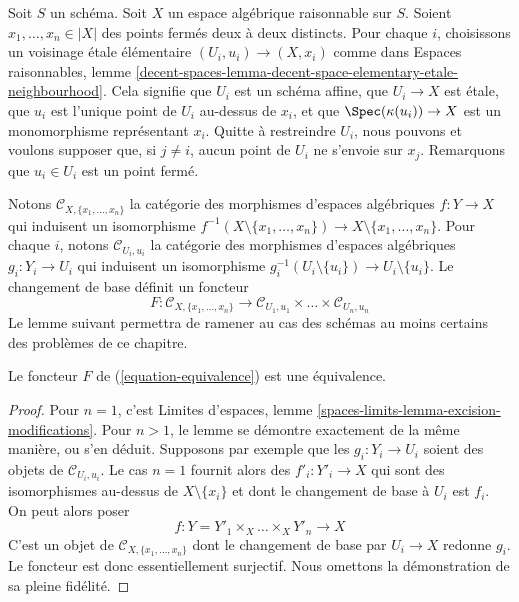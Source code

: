 \noindent
Soit $S$ un schéma. Soit $X$ un espace algébrique raisonnable sur $S$.
Soient $x_1, \ldots, x_n \in |X|$ des points fermés deux à deux distincts.
Pour chaque $i$, choisissons un voisinage étale élémentaire
$(U_i, u_i) \to (X, x_i)$ comme dans Espaces raisonnables, lemme
\ref{decent-spaces-lemma-decent-space-elementary-etale-neighbourhood}.
Cela signifie que $U_i$ est un schéma affine, que $U_i \to X$ est étale,
que $u_i$ est l'unique point de $U_i$ au-dessus de $x_i$, et que
$\Spec(\kappa(u_i)) \to X$ est un monomorphisme représentant $x_i$.
Quitte à restreindre $U_i$, nous pouvons et voulons supposer que, si
$j \not = i$, aucun point de $U_i$ ne s'envoie sur $x_j$.
Remarquons que $u_i \in U_i$ est un point fermé.

\medskip\noindent
Notons $\mathcal{C}_{X, \{x_1, \ldots, x_n\}}$ la catégorie des
morphismes d'espaces algébriques $f : Y \to X$ qui induisent un isomorphisme
$f^{-1}(X \setminus \{x_1, \ldots, x_n\}) \to
X \setminus \{x_1, \ldots, x_n\}$.
Pour chaque $i$, notons $\mathcal{C}_{U_i, u_i}$ la catégorie des
morphismes d'espaces algébriques $g_i : Y_i \to U_i$ qui induisent un
isomorphisme $g_i^{-1}(U_i \setminus \{u_i\}) \to U_i \setminus \{u_i\}$.
Le changement de base définit un foncteur
\begin{equation}
\label{equation-equivalence}
F :
\mathcal{C}_{X, \{x_1, \ldots, x_n\}}
\longrightarrow
\mathcal{C}_{U_1, u_1} \times \ldots \times \mathcal{C}_{U_n, u_n}
\end{equation}
Le lemme suivant permettra de ramener au cas des schémas au moins certains
des problèmes de ce chapitre.

\begin{lemma}
\label{lemma-equivalence}
Le foncteur $F$ de (\ref{equation-equivalence}) est une équivalence.
\end{lemma}

\begin{proof}
Pour $n = 1$, c'est Limites d'espaces, lemme
\ref{spaces-limits-lemma-excision-modifications}.
Pour $n > 1$, le lemme se démontre exactement de la même manière, ou s'en
déduit. Supposons par exemple que les $g_i : Y_i \to U_i$ soient des objets
de $\mathcal{C}_{U_i, u_i}$. Le cas $n = 1$ fournit alors des
$f'_i : Y'_i \to X$ qui sont des isomorphismes au-dessus de
$X \setminus \{x_i\}$ et dont le changement de base à $U_i$ est $f_i$.
On peut alors poser
$$
f : Y = Y'_1 \times_X \ldots \times_X Y'_n \to X
$$
C'est un objet de $\mathcal{C}_{X, \{x_1, \ldots, x_n\}}$ dont le
changement de base par $U_i \to X$ redonne $g_i$. Le foncteur est donc
essentiellement surjectif. Nous omettons la démonstration de sa
pleine fidélité.
\end{proof}

